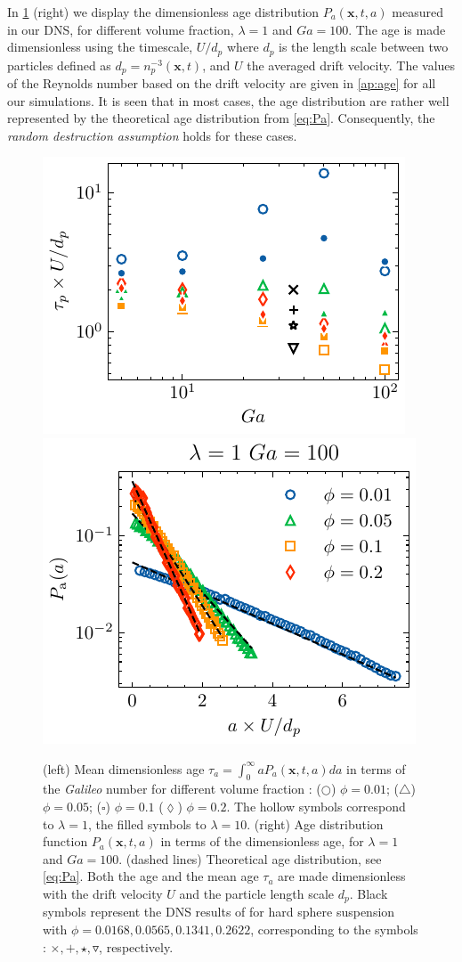 In \ref{fig:age_picture} (right) we display the dimensionless age distribution $P_a(\textbf{x},t,a)$ measured in our DNS, for different volume fraction, $\lambda =1$ and $Ga = 100$. 
The age is made dimensionless using the timescale, $U/d_p$ where $d_p$ is the length scale between two particles defined as $d_p = n_p^{-3}(\textbf{x},t)$, and $U$ the averaged drift velocity.
The values of the Reynolds number based on the drift velocity are given in \ref{ap:age} for all our simulations. 
It is seen that in most cases, the age distribution are rather well represented by the theoretical age distribution from \ref{eq:Pa}.
Consequently, the \textit{random destruction assumption} holds for these cases. 
\begin{figure}[h!]
    \centering
    \includegraphics[height = 0.3\textwidth]{image/HOMOGENEOUS_NEW/tau_Ga.pdf}
    \includegraphics[height = 0.3\textwidth]{image/HOMOGENEOUS_NEW/Dist/Pa_l_1_Ga_100.pdf}
    \caption{
    (left) Mean dimensionless age $\tau_a =  \int_0^\infty aP_a(\textbf{x},t,a)da$ in terms of the \textit{Galileo} number for different volume fraction :   
    ($\pmb\bigcirc$) $\phi = 0.01$; ($\pmb\triangle$) $ \phi = 0.05$; ($\pmb\square$) $\phi = 0.1$ ($\pmb\lozenge$) $\phi = 0.2$.
    The hollow symbols correspond to $\lambda = 1$, the filled symbols to $\lambda = 10$.
    (right) Age distribution function $P_a(\textbf{x},t,a)$ in terms of the dimensionless age, for $\lambda = 1$ and  $Ga = 100$.
    (dashed lines) Theoretical age distribution, see \ref{eq:Pa}. 
    Both the age and the mean age $\tau_a$ are made dimensionless with the drift velocity $U$ and the particle length scale $d_p$.  
    Black symbols represent the DNS results of \citet{zhang2023evolution} for hard sphere suspension with $\phi = 0.0168,0.0565,0.1341,0.2622$, corresponding to the symbols : $\pmb\times, \pmb +, \pmb\star , \pmb\triangledown$, respectively.
    }
    \label{fig:age_picture}
\end{figure}
